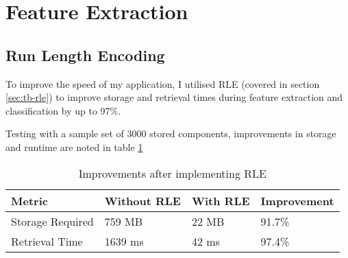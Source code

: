 \section{Feature Extraction}

\subsection{Run Length Encoding}
To improve the speed of my application, I utilised \acrfull{RLE} (covered in section \ref{sec:tb-rle}) to improve storage and retrieval times during feature extraction and classification by up to 97\%.

Testing with a sample set of 3000 stored components, improvements in storage and runtime are noted in table \ref{table:rle-improvement}

\begin{table}[h]

    \begin{tabularx}{\textwidth}{ X X X X }
    \toprule
    Metric                  & Without RLE   & With RLE   & Improvement \\
    \midrule
    Storage Required        & 759 MB        & 22 MB      & 91.7\%      \\
    Retrieval Time          & 1639 ms       & 42 ms      & 97.4\% \\
    \bottomrule
    \end{tabularx}
    
    \label{table:rle-improvement}
    \caption{Improvements after implementing RLE}
\end{table}